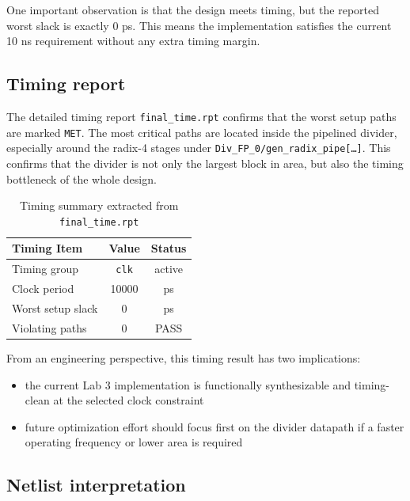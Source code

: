 One important observation is that the design meets timing, but the reported worst slack is exactly 0 ps. This means the implementation satisfies the current 10 ns requirement without any extra timing margin.

\subsection{Timing report}

The detailed timing report \texttt{final\_time.rpt} confirms that the worst setup paths are marked \texttt{MET}. The most critical paths are located inside the pipelined divider, especially around the radix-4 stages under \texttt{Div\_FP\_0/gen\_radix\_pipe[\dots]}. This confirms that the divider is not only the largest block in area, but also the timing bottleneck of the whole design.

\begin{table}[H]
\centering
\renewcommand{\arraystretch}{1.2}
\begin{tabular}{lcc}
\toprule
\textbf{Timing Item} & \textbf{Value} & \textbf{Status} \\
\midrule
Timing group & \texttt{clk} & active \\
Clock period & 10000 & ps \\
Worst setup slack & 0 & ps \\
Violating paths & 0 & PASS \\
\bottomrule
\end{tabular}
\caption{Timing summary extracted from \texttt{final\_time.rpt}}
\label{tab:lab3_timing_summary}
\end{table}

From an engineering perspective, this timing result has two implications:
\begin{itemize}
    \item the current Lab 3 implementation is functionally synthesizable and timing-clean at the selected clock constraint
    \item future optimization effort should focus first on the divider datapath if a faster operating frequency or lower area is required
\end{itemize}

\subsection{Netlist interpretation}

